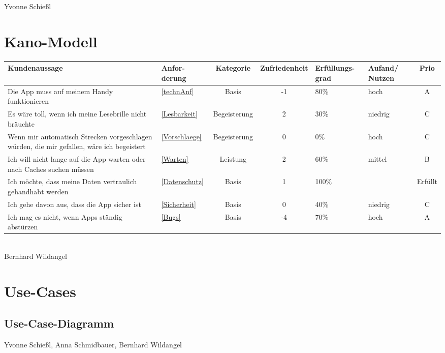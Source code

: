 \documentclass[a4paper, 12pp]{article}
\begin{document}
Yvonne Schießl

\section{Kano-Modell}
\begin{tabular}{ | p{5cm} | p{1.1cm} | c | c | p{1.7cm} | p{1.5cm} | c |}
\hline
Kundenaussage & Anfor-derung & Kategorie & Zufriedenheit & Erfüllungs-grad & Aufand/ Nutzen & Prio \\ \hline
Die App muss auf meinem Handy funktionieren  & \ref{technAnf} & Basis & -1 & 80\% & hoch & A \\ \hline
Es wäre toll, wenn ich meine Lesebrille nicht bräuchte & \ref{Lesbarkeit} & Begeisterung & 2 & 30\% & niedrig & C \\ \hline
Wenn mir automatisch Strecken vorgeschlagen würden, die mir gefallen, wäre ich begeistert & \ref{Vorschlaege} & Begeisterung & 0 & 0\% & hoch & C \\ \hline
Ich will nicht lange auf die App warten oder nach Caches suchen müssen & \ref{Warten} & Leistung & 2 & 60\% & mittel	& B \\ \hline
Ich möchte, dass meine Daten vertraulich gehandhabt werden & \ref{Datenschutz} & Basis & 1 & 100\% & & Erfüllt \\ \hline
Ich gehe davon aus, dass die App sicher ist & \ref{Sicherheit} & Basis & 0 & 40\% & niedrig & C \\ \hline
Ich mag es nicht, wenn Apps ständig abstürzen & \ref{Bugs} & Basis & -4 & 70\% & hoch & A \\ \hline
\end{tabular}\\

Bernhard Wildangel

\section{Use-Cases}
\subsection{Use-Case-Diagramm}

\begin{figure}[H] 
\centering
	\fbox{\begin{minipage}{16cm} 
	\end{minipage}}
\end{figure}
Yvonne Schießl, Anna Schmidbauer, Bernhard Wildangel
\end{document}
